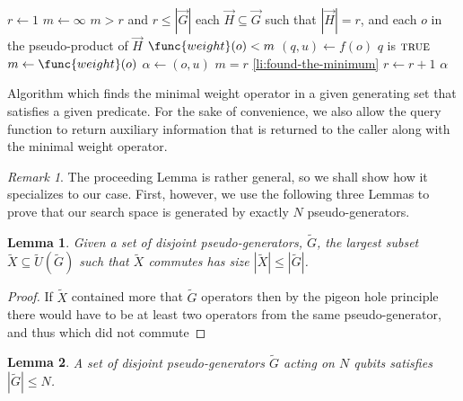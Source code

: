 \documentclass{amsbook}
\theoremstyle{plain}
\newtheorem{lemma}{Lemma}
\theoremstyle{definition}
\theoremstyle{remark}
\newtheorem{remark}{Remark}
\newcommand{\lst}{\vec}
\newcommand{\set}{\tilde}
\begin{document}
\begin{table}
\begin{codebox}
\Procname{$\proc{Find-Weight-Minimizer}(f,\lst G)$}
\li $r \gets 1$
\li $m \gets \infty$
\li \While $m > r$ and $r \le |\lst G|$
\li \Do
\li     \For each $\lst H\subseteq \lst G$ such that $|\lst H|=r$,
\li     and each $o$ in the pseudo-product of $\lst H$
\li     \Do
\li         \If $\func{weight}(o) < m$
\li         \Then
\li             $(q,u) \gets f(o)$
\li             \If $q$ is $\textsc{true}$
\li             \Then
\li                 $m \gets \func{weight}(o)$
\li                 $\alpha \gets (o,u)$
\li                 \If $m = r$
\li                 \Then
\li                     \Goto \ref{li:found-the-minimum}
                    \End
                \End
            \End
        \End
\li     $r \gets r + 1$
    \End
\li \Return $\alpha$ \label{li:found-the-minimum}
\end{codebox}
\caption[Algorithm ]{Algorithm which finds the minimal weight operator in a given generating set that satisfies a given predicate.  For the sake of convenience, we also allow the query function to return auxiliary information that is returned to the caller along with the minimal weight operator.} \label{table:find-weight-minimizer}
\end{table}
\begin{remark}
The proceeding Lemma is rather general, so we shall show how it specializes to our case.  First, however, we use the following three Lemmas to prove that our search space is generated by exactly $N$ pseudo-generators.
\end{remark}

\begin{lemma}
\label{lemma:lower bound on number of disjoint pseudo-generators}
Given a set of disjoint pseudo-generators, $\set G$, the largest subset $\set X\subseteq\set U(\set G)$ such that $\set X$ commutes has size $|\set X|\le|\set G|$.
\end{lemma}

\begin{proof}
If $\set X$ contained more that $\set G$ operators then by the pigeon hole principle there would have to be at least two operators from the same pseudo-generator, and thus which did not commute
\end{proof}

\begin{lemma}
\label{lemma:upper bound on number of disjoint pseudo-generators}
A set of disjoint pseudo-generators $\set G$ acting on $N$ qubits satisfies $|\set G|\le N$.
\end{lemma}
\end{document}
